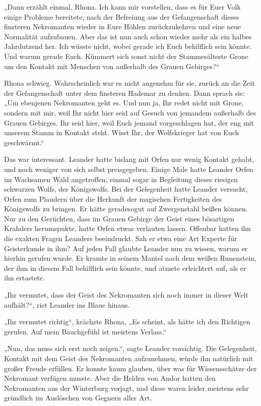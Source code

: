 „Dann erzählt einmal, Rhona. Ich kann mir vorstellen, dass es für Euer Volk einige Probleme bereitete, nach der Befreiung aus der Gefangenschaft dieses finsteren Nekromanten wieder in Eure Höhlen zurückzukehren und eine neue Normalität aufzubauen. Aber das ist nun auch schon wieder mehr als ein halbes Jahrdutzend her. Ich wüsste nicht, wobei gerade ich Euch behilflich sein könnte. Und warum gerade Euch. Kümmert sich sonst nicht der Stammesälteste Grone um den Kontakt mit Menschen von außerhalb des Grauen Gebirges?“

Rhona schwieg. Wahrscheinlich war es nicht angenehm für sie, zurück an die Zeit der Gefangenschaft unter dem finsteren Hademar zu denken. Dann sprach sie: „Um ebenjenen Nekromanten geht es. Und nun ja, Ihr redet nicht mit Grone, sondern mit mir, weil Ihr nicht hier seid auf Gesuch von jemandem außerhalb des Grauen Gebirges. Ihr seid hier, weil Euch jemand vorgeschlagen hat, der eng mit unserem Stamm in Kontakt steht. Wisst Ihr, der Wolfskrieger hat von Euch geschwärmt.“

Das war interessant. Leander hatte bislang mit Orfen nur wenig Kontakt gehabt, und noch weniger von sich selbst preisgegeben. Einige Male hatte Leander Orfen im Wachsamen Wald angetroffen, einmal sogar in Begleitung dieses riesigen schwarzen Wolfs, des Königswolfs. Bei der Gelegenheit hatte Leander versucht, Orfen zum Plaudern über die Herkunft der magischen Fertigkeiten des Königswolfs zu bringen. Er hätte geradesogut auf Zwergenstahl beißen können. Nur zu den Gerüchten, dass im Grauen Gebirge der Geist eines bösartigen Krahders herumspukte, hatte Orfen etwas verlauten lassen. Offenbar hatten ihn die exakten Fragen Leanders beeindruckt. Sah er etwa eine Art Experte für Geisterkunde in ihm? Auf jeden Fall glaubte Leander nun zu wissen, warum er hierhin gerufen wurde. Er kramte in seinem Mantel nach dem weißen Runenstein, der ihm in diesem Fall behilflich sein könnte, und atmete erleichtert auf, als er ihn ertastete.

„Ihr vermutet, dass der Geist des Nekromanten sich noch immer in dieser Welt aufhält?“, riet Leander ins Blaue hinaus.

„Ihr vermutet richtig“, krächzte Rhona, „Es scheint, als hätte ich den Richtigen gerufen. Auf mein Bauchgefühl ist meistens Verlass.“

„Nun, das muss sich erst noch zeigen.“, sagte Leander vorsichtig. Die Gelegenheit, Kontakt mit dem Geist des Nekromanten aufzunehmen, würde ihn natürlich mit großer Freude erfüllen. Er konnte kaum glauben, über was für Wissensschätze der Nekromant verfügen musste. Aber die Helden von Andor hatten den Nekromanten aus der Winterburg verjagt, und diese waren leider meistens sehr gründlich im Auslöschen von Gegnern aller Art.

